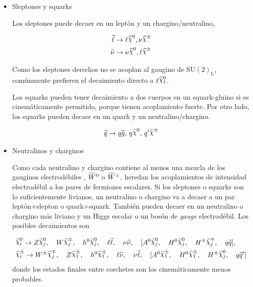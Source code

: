 \begin{itemize}\itemsep0.2cm\parskip0.2cm

\item Sleptones y squarks

  Los sleptones puede decaer en un leptón y un chargino/neutralino,

  \begin{align}
    \slepton &\to \ell \nino, \nu\chinopm \\
    \snu &\to \nu\nino, \ell\chinopm
  \end{align}

  Como los sleptones derechos no se acoplan al gaugino de $\text{SU}(2)_\text{L}$,
  comúnmente prefieren el decaimiento directo a $\ell\ninoone$.

  Los squarks pueden tener decaimiento a dos cuerpos en un squark-gluino si es
  cinemáticamente permitido, porque tienen acoplamiento fuerte. Por otro
  lado, los squarks pueden decaer en un quark y un neutralino/chargino.

  \begin{equation}
    \susy{q} \to q\gluino, \, q\nino, \, q^\prime \chinopm
  \end{equation}


\item Neutralinos y charginos

  Como cada neutralino y chargino contiene al menos una mezcla de los gauginos
  electrodébiles {\bino}, $\widetilde{W}^0$ o $\widetilde{W}^{\pm}$, heredan los
  acoplamientos de intensidad electrodébil a los pares de fermiones escalares. Si
  los sleptones o squarks son lo suficientemente livianos, un neutralino o
  chargino va a decaer a un par leptón+slepton o quark+squark. También pueden
  decaer en un neutralino o chargino más liviano y un Higgs escalar o un bosón
  de \emph{gauge} electrodébil. Los posibles decaimientos son

\begin{align}
  &\ninoi \to Z \ninoj, \quad W \chinopmj, \quad h^0 \ninoj, \quad \ell \susy{\ell}, \quad \nu \susy{\nu}, \quad [A^0 \ninoj, \quad H^0 \ninoj, \quad H^{\pm} \chinompj, \quad q \susy{q}], \\
  &\chinopmi \to W^{\pm} \chinompj, \quad Z \chinoonepm, \quad h^0 \chinoonepm, \quad \ell \susy{\nu}, \quad \nu \susy{\ell}, \quad [A^0 \chinoonepm, \quad H^0 \chinoonepm, \quad H^{\pm} \ninoj, \quad q \susy{q}']
\end{align}
%
donde los estados finales entre corchetes son los cinemáticamente menos
probables.



\end{itemize}
